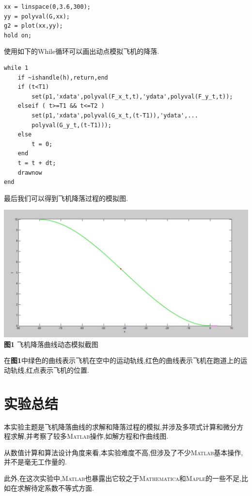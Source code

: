 \documentclass[a4paper,12pt]{article}
\begin{document}
\begin{CJK*}{UTF8}{gbsn}
\begin{lstlisting}
xx = linspace(0,3.6,300);
yy = polyval(G,xx);
g2 = plot(xx,yy);
hold on;
\end{lstlisting}
\vspace{7pt}
\par 使用如下的While循环可以画出动点模拟飞机的降落.
\vspace{-11pt}
\begin{lstlisting}
while 1
    if ~ishandle(h),return,end
    if (t<T1)
        set(p1,'xdata',polyval(F_x_t,t),'ydata',polyval(F_y_t,t));
    elseif ( t>=T1 && t<=T2 )
        set(p1,'xdata',polyval(G_x_t,(t-T1)),'ydata',...
        polyval(G_y_t,(t-T1)));
    else
        t = 0;
    end
    t = t + dt;
    drawnow
end
\end{lstlisting}
\vspace{7pt}
\par 最后我们可以得到飞机降落过程的模拟图.
\begin{center}
\includegraphics[width = 13.5cm]{plane.jpg}\\
\textbf{图1} 飞机降落曲线动态模拟截图\\
\end{center}
\par 在\textbf{图1}中绿色的曲线表示飞机在空中的运动轨线,红色的曲线表示飞机在跑道上的运动轨线,红点表示飞机的位置.
\section{实验总结}
本实验主题是飞机降落曲线的求解和降落过程的模拟,并涉及多项式计算和微分方程求解,并考察了较多\textsc{Matlab}操作,如解方程和作曲线图.\par 从数值计算和算法设计角度来看,本实验难度不高,但涉及了不少\textsc{Matlab}基本操作,并不是毫无工作量的.\par 此外,在这次实验中,\textsc{Matlab}也暴露出它较之于\textsc{Mathematica}和\textsc{Maple}的一些不足,比如在求解待定系数不等式方面.


\end{CJK*}
\end{document}
